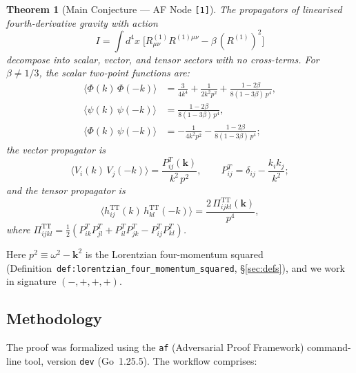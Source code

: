 \documentclass[11pt,a4paper]{article}
\newtheorem{theorem}{Theorem}[section]
\newcommand{\TT}{\mathrm{TT}}
\newcommand{\afnode}[1]{\texttt{[#1]}}
\newcommand{\afdef}[1]{\texttt{def:#1}}
\begin{document}
\begin{theorem}[Main Conjecture --- AF Node \afnode{1}]
\label{thm:main}
The propagators of linearised fourth-derivative gravity with action
\begin{equation}
I = \int d^4x\;\bigl[R^{(1)}_{\mu\nu}R^{(1)\mu\nu} - \beta\,(R^{(1)})^2\bigr]
\label{eq:action}
\end{equation}
decompose into scalar, vector, and tensor sectors with no cross-terms.
For $\beta \neq 1/3$, the scalar two-point functions are:
\begin{align}
\langle\Phi(k)\,\Phi(-k)\rangle &= \frac{3}{4k^4} + \frac{1}{2k^2p^2} + \frac{1-2\beta}{8(1-3\beta)\,p^4}, \label{eq:phiphi}\\
\langle\psi(k)\,\psi(-k)\rangle &= \frac{1-2\beta}{8(1-3\beta)\,p^4}, \label{eq:psipsi}\\
\langle\Phi(k)\,\psi(-k)\rangle &= -\frac{1}{4k^2p^2} - \frac{1-2\beta}{8(1-3\beta)\,p^4}; \label{eq:phipsi}
\end{align}
the vector propagator is
\begin{equation}
\langle V_i(k)\,V_j(-k)\rangle = \frac{P^T_{ij}(\mathbf{k})}{k^2\,p^2},\qquad
P^T_{ij} = \delta_{ij} - \frac{k_ik_j}{k^2}; \label{eq:vector}
\end{equation}
and the tensor propagator is
\begin{equation}
\langle h^{\TT}_{ij}(k)\,h^{\TT}_{kl}(-k)\rangle = \frac{2\,\Pi^{\TT}_{ijkl}(\mathbf{k})}{p^4}, \label{eq:tensor}
\end{equation}
where $\Pi^{\TT}_{ijkl} = \tfrac{1}{2}(P^T_{ik}P^T_{jl} + P^T_{il}P^T_{jk} - P^T_{ij}P^T_{kl})$.
\end{theorem}

Here $p^2 \equiv \omega^2 - \mathbf{k}^2$ is the Lorentzian four-momentum squared
(Definition~\afdef{lorentzian\_four\_momentum\_squared}, \S\ref{sec:defs}),
and we work in signature $(-,+,+,+)$.

\subsection{Methodology}

The proof was formalized using the \texttt{af} (Adversarial Proof Framework)
command-line tool, version \texttt{dev} (Go~1.25.5). The workflow comprises:
\end{document}

